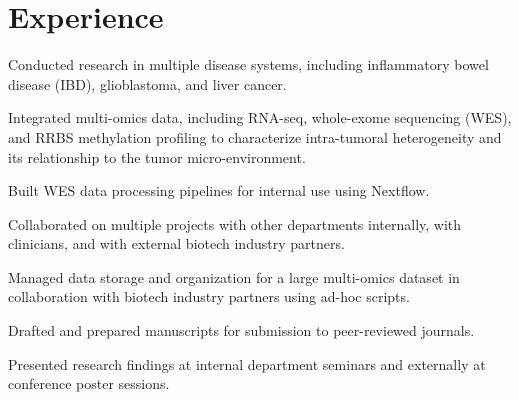 \begin{minipage}[t]{0.66\textwidth} %


\section{Experience}

\vspace{\topsep} %
\begin{tightitemize}
\item Conducted research in multiple disease systems, including inflammatory bowel disease (IBD), glioblastoma, and liver cancer.
\item Integrated multi-omics data, including RNA-seq, whole-exome sequencing (WES), and RRBS methylation profiling to characterize intra-tumoral heterogeneity and its relationship to the tumor micro-environment.
\item Built WES data processing pipelines for internal use using Nextflow.
\item Collaborated on multiple projects with other departments internally, with clinicians, and with external biotech industry partners.
\item Managed data storage and organization for a large multi-omics dataset in collaboration with biotech industry partners using ad-hoc scripts.
\item Drafted and prepared manuscripts for submission to peer-reviewed journals.
\item Presented research findings at internal department seminars and externally at conference poster sessions. 
\end{tightitemize}

\sectionspace %



\end{minipage}
